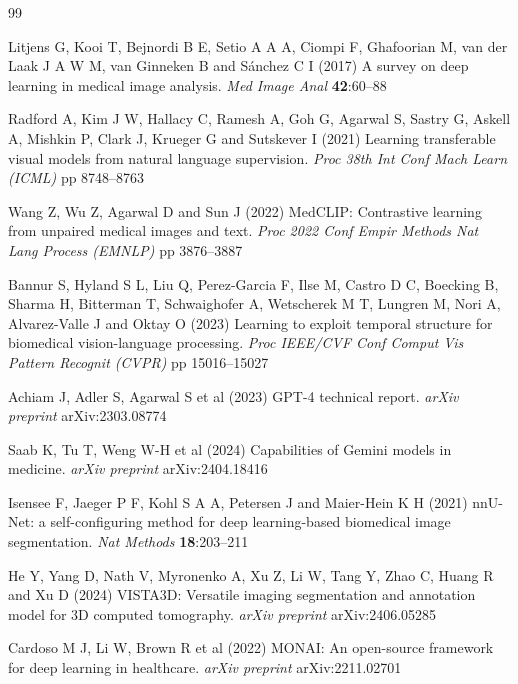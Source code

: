 \documentclass[lineno,referee,pdflatex,sn-mathphys-num]{sn-jnl}
\begin{document}
\begin{thebibliography}{99}

Litjens G, Kooi T, Bejnordi B E, Setio A A A, Ciompi F, Ghafoorian M,
van der Laak J A W M, van Ginneken B and S\'{a}nchez C I (2017)
A survey on deep learning in medical image analysis.
\textit{Med Image Anal} \textbf{42}:60--88

Radford A, Kim J W, Hallacy C, Ramesh A, Goh G, Agarwal S, Sastry G,
Askell A, Mishkin P, Clark J, Krueger G and Sutskever I (2021)
Learning transferable visual models from natural language supervision.
\textit{Proc 38th Int Conf Mach Learn (ICML)} pp 8748--8763

Wang Z, Wu Z, Agarwal D and Sun J (2022)
MedCLIP: Contrastive learning from unpaired medical images and text.
\textit{Proc 2022 Conf Empir Methods Nat Lang Process (EMNLP)} pp 3876--3887

Bannur S, Hyland S L, Liu Q, Perez-Garcia F, Ilse M, Castro D C,
Boecking B, Sharma H, Bitterman T, Schwaighofer A, Wetscherek M T,
Lungren M, Nori A, Alvarez-Valle J and Oktay O (2023)
Learning to exploit temporal structure for biomedical vision-language
processing.
\textit{Proc IEEE/CVF Conf Comput Vis Pattern Recognit (CVPR)} pp 15016--15027

Achiam J, Adler S, Agarwal S et al (2023)
GPT-4 technical report.
\textit{arXiv preprint} arXiv:2303.08774

Saab K, Tu T, Weng W-H et al (2024)
Capabilities of Gemini models in medicine.
\textit{arXiv preprint} arXiv:2404.18416

Isensee F, Jaeger P F, Kohl S A A, Petersen J and Maier-Hein K H (2021)
nnU-Net: a self-configuring method for deep learning-based biomedical
image segmentation.
\textit{Nat Methods} \textbf{18}:203--211

He Y, Yang D, Nath V, Myronenko A, Xu Z, Li W, Tang Y, Zhao C, Huang R
and Xu D (2024)
VISTA3D: Versatile imaging segmentation and annotation model for 3D
computed tomography.
\textit{arXiv preprint} arXiv:2406.05285

Cardoso M J, Li W, Brown R et al (2022)
MONAI: An open-source framework for deep learning in healthcare.
\textit{arXiv preprint} arXiv:2211.02701


\end{thebibliography}
\end{document}
